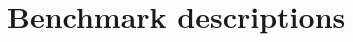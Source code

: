 \documentclass[12pt,twoside,notitlepage]{report}
\begin{document}











\cleardoublepage

\chapter {Benchmark descriptions}
\end{document}
